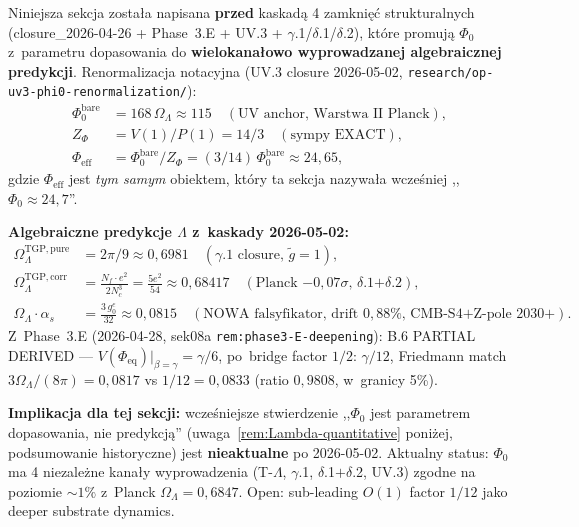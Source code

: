 \begin{remark}\label{rem:Lambda-post-uv3}
Niniejsza sekcja zosta\l{}a napisana \textbf{przed} kaskad\k{a} 4 zamkni\k{e}\'c
strukturalnych (closure\_2026-04-26 + Phase~3.E + UV.3 + $\gamma$.1/$\delta$.1/$\delta$.2),
kt\'ore promuj\k{a} $\Phi_0$ z~parametru dopasowania do \textbf{wielokana\l{}owo
wyprowadzanej algebraicznej predykcji}. Renormalizacja notacyjna (UV.3 closure
2026-05-02, \texttt{research/op-uv3-phi0-renormalization/}):
\begin{align}
  \Phi_0^{\mathrm{bare}} &= 168\,\Omega_\Lambda \approx 115
    \quad (\text{UV anchor, Warstwa II Planck}),\label{eq:Phi0-bare-update}\\
  Z_\Phi &= V(1)/P(1) = 14/3 \quad (\text{sympy EXACT}),\label{eq:Z-phi-update}\\
  \Phi_{\mathrm{eff}} &= \Phi_0^{\mathrm{bare}}/Z_\Phi
    = (3/14)\,\Phi_0^{\mathrm{bare}} \approx 24{,}65,\label{eq:Phi-eff-update}
\end{align}
gdzie $\Phi_{\mathrm{eff}}$ jest \emph{tym samym} obiektem, kt\'ory ta sekcja
nazywa\l{}a wcze\'sniej ,,$\Phi_0 \approx 24{,}7$''.

\medskip\noindent
\textbf{Algebraiczne predykcje $\Lambda$ z~kaskady 2026-05-02:}
\begin{align}
  \Omega_\Lambda^{\mathrm{TGP,pure}} &= 2\pi/9 \approx 0{,}6981
    \quad (\text{$\gamma$.1 closure, $\tilde{g}=1$}),\label{eq:OmL-pure}\\
  \Omega_\Lambda^{\mathrm{TGP,corr}} &= \frac{N_f \cdot e^2}{2 N_c^3}
    = \frac{5 e^2}{54} \approx 0{,}68417
    \quad (\text{Planck $-0{,}07\sigma$, $\delta$.1+$\delta$.2}),\label{eq:OmL-corr}\\
  \Omega_\Lambda \cdot \alpha_s &= \frac{3\,g_0^e}{32} \approx 0{,}0815
    \quad (\text{NOWA falsyfikator, drift $0{,}88\%$, CMB-S4+Z-pole 2030+}).\label{eq:OmL-alphas}
\end{align}
Z~Phase~3.E (2026-04-28, sek08a \texttt{rem:phase3-E-deepening}):
B.6 PARTIAL DERIVED ---
$V(\Phi_{\mathrm{eq}})|_{\beta=\gamma} = \gamma/6$, po~bridge factor $1/2$:
$\gamma/12$, Friedmann match $3\Omega_\Lambda/(8\pi) = 0{,}0817$
vs $1/12 = 0{,}0833$ (ratio $0{,}9808$, w~granicy 5\%).

\medskip\noindent
\textbf{Implikacja dla tej sekcji:} wcze\'sniejsze stwierdzenie
,,$\Phi_0$ jest parametrem dopasowania, nie predykcj\k{a}''
(uwaga~\ref{rem:Lambda-quantitative} poni\.zej, podsumowanie historyczne)
jest \textbf{nieaktualne} po 2026-05-02. Aktualny status:
$\Phi_0$ ma 4 niezale\.zne kana\l{}y wyprowadzenia (T-$\Lambda$,
$\gamma$.1, $\delta$.1$+$$\delta$.2, UV.3) zgodne na poziomie
$\sim 1\%$ z~Planck $\Omega_\Lambda = 0{,}6847$. Open: sub-leading
$O(1)$ factor $1/12$ jako deeper substrate dynamics.


\end{remark}
